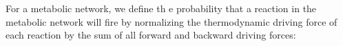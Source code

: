 For a metabolic network, we define th
e probability that a reaction in the metabolic network will fire by normalizing the thermodynamic driving force of each reaction by the sum of all forward and backward driving forces: